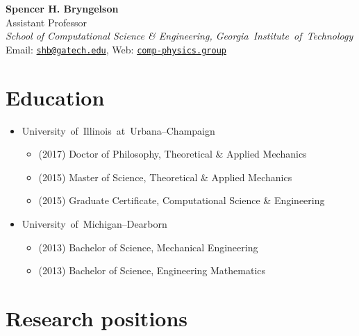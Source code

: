 \documentclass[11pt]{article}
\newcommand\GIT{\mbox{Georgia Institute of Technology}\xspace}
\newcommand\UIUC{\mbox{University of Illinois at Urbana--Champaign}\xspace}
\newcommand\UMD{\mbox{University of Michigan--Dearborn}\xspace}
\begin{document}
\begin{center}
    {\Large \bf Spencer H. Bryngelson} \\ \smallskip
Assistant Professor \\ 
\textit{School of Computational Science \& Engineering, \GIT} \\ \smallskip
    Email: \href{mailto:shb@gatech.edu}{\texttt{shb@gatech.edu}}, Web:
    \href{https://comp-physics.group}{\texttt{comp-physics.group}}
\end{center}


\section{Education}

\begin{itemize}
    \item \UIUC
    \begin{itemize}
        \item (2017) Doctor of Philosophy, Theoretical \& Applied Mechanics
        \item (2015) Master of Science, Theoretical \& Applied Mechanics
        \item (2015) Graduate Certificate, Computational Science \& Engineering
    \end{itemize}
    \item \UMD
    \begin{itemize}
        \item (2013) Bachelor of Science, Mechanical Engineering
        \item (2013) Bachelor of Science, Engineering Mathematics
    \end{itemize}
\end{itemize}


\section{Research positions}
\end{document}
